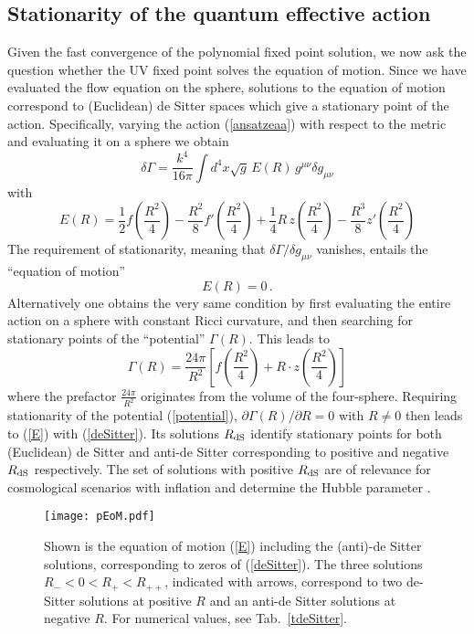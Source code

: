 \documentclass[notitlepage,eqsecnum,bm,amsmath,preprintnumbers,superscriptaddress,nofootinbib,aps,11pt]{revtex4-1}
\def\eq#1{(\ref{#1})}
\def\R{\rho}
\def\R{R}
\def\beq{\begin{equation}}
\def\eeq{\end{equation}}
\begin{document}
\subsection{Stationarity of the quantum effective action}
Given the fast convergence of the polynomial fixed point solution, we now ask the question whether the UV fixed point solves the equation of motion. 
Since we have evaluated the flow equation on the sphere, solutions to the equation of motion correspond to (Euclidean)  de Sitter  spaces which give a stationary point of the action. Specifically, varying the action \eq{ansatzeaa} with respect to the metric and evaluating it on a sphere we obtain
\beq \label{deltaGamma}
\delta \Gamma =\frac{k^4}{16 \pi} \int d^4x \sqrt{g} 
\,E(\R) \,
g^{\mu \nu} \delta g_{\mu \nu}
\eeq
with
\beq \label{E}
E(\R) = \frac1 2 f\left(\frac{\R^2}{4}\right) - \frac{\R^2}{8} f'\left(\frac{\R^2}{4}\right) +  \frac{1}{4} \R\, z\left(\frac{\R^2}{4}\right)- \frac{\R^3}{8} z'\left(\frac{\R^2}{4}\right)
\eeq
The requirement of stationarity, meaning that $\delta \Gamma/\delta g_{\mu \nu}$ vanishes, entails the ``equation of motion''
\begin{equation}\label{deSitter}
E(\R)=0\,.
\end{equation}
Alternatively one obtains the very same condition by first evaluating the entire action on a sphere with constant Ricci curvature, and then searching for  stationary points of the ``potential'' $\Gamma(\R)$. This leads to
\beq\label{potential}
\Gamma(\R) = \frac{24 \pi }{ \R^2} \left[f\left(\frac{\R^2}{4}\right) + \R \cdot z\left(\frac{\R^2}{4}\right)\right]
\eeq
where the prefactor $\frac{24 \pi }{ \R^2}$ originates from the volume of the four-sphere. Requiring stationarity of the potential \eq{potential}, $\partial \Gamma(\R)/\partial\R=0$  with $\R \neq 0$ then leads to \eq{E} with \eq{deSitter}.
Its solutions $\R_{\rm dS}$ identify  stationary points for both (Euclidean) de Sitter and
 anti-de Sitter corresponding to positive and negative $\R_{\rm dS}$ respectively. The set of solutions with positive $\R_{\rm dS}$ are of relevance for cosmological scenarios with inflation and determine the Hubble parameter \cite{Falls:2016wsa}. 
 

 

 \begin{figure*}[t]
\begin{center}
\texttt{[image: pEoM.pdf]}
\caption{\label{pdeSitter} Shown is the equation of motion  \eq{E} including the (anti)-de Sitter solutions, corresponding to zeros of  \eq{deSitter}.
The three solutions $\R_-<0<\R_+<\R_{++}$, indicated with arrows, correspond to two de-Sitter solutions at positive $R$ and an anti-de Sitter solutions at negative $R$. For numerical values, see Tab.~\ref{tdeSitter}.}
\end{center}
\end{figure*}
\end{document}
